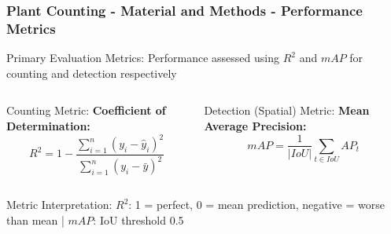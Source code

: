 \documentclass[aspectratio=43]{beamer}
\begin{document}
\begin{frame}
    \frametitle{Plant Counting - Material and Methods - Performance Metrics}
    
    \begin{block}{Primary Evaluation Metrics:}
        \small Performance assessed using $R^2$ and $mAP$ for counting and detection respectively
    \end{block}
    
    \begin{columns}
        \begin{column}{0.5\textwidth}
            \begin{exampleblock}{Counting Metric:}
                \scriptsize
                \textbf{Coefficient of Determination:}
                $$R^2 = 1 - \frac{\sum_{i=1}^{n} (y_i - \hat{y}_i)^2}{\sum_{i=1}^{n} (y_i - \bar{y})^2}$$
            \end{exampleblock}
        \end{column}
        
        \begin{column}{0.5\textwidth}
                \scriptsize
            \begin{alertblock}{Detection (Spatial) Metric:}
                \scriptsize
                \textbf{Mean Average Precision:}
                $$mAP = \frac{1}{|IoU|}\sum_{t \in IoU}AP_t$$
             \end{alertblock}
        \end{column}
    \end{columns}
    
    \begin{block}{Metric Interpretation:}
        \scriptsize
        $R^2$: 1 = perfect, 0 = mean prediction, negative = worse than mean | $mAP$: IoU threshold 0.5 %
    \end{block}
\end{frame}
\end{document}
